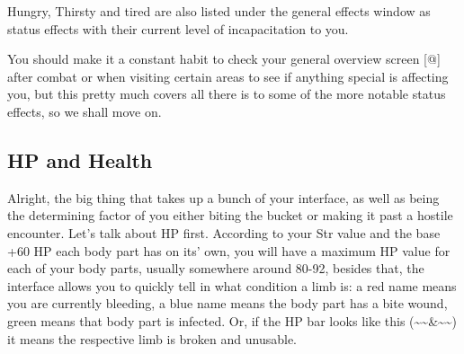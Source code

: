 \documentclass[11pt]{report}
\begin{document}
Hungry, Thirsty and tired are also listed under the general effects window as status effects with their current level of incapacitation to you.

You should make it a constant habit to check your general overview screen [@] after combat or when visiting certain areas to see if anything special is affecting you, but this pretty much covers all there is to some of the more notable status effects, so we shall move on.

\subsection{HP and Health}

Alright, the big thing that takes up a bunch of your interface, as well as being the determining factor of you either biting the bucket or making it past a hostile encounter. Let's talk about HP first. According to your Str value and the base +60 HP each body part has on its' own, you will have a maximum HP value for each of your body parts, usually somewhere around 80-92, besides that, the interface allows you to quickly tell in what condition a limb is: a red name means you are currently bleeding, a blue name means the body part has a bite wound, green means that body part is infected. Or, if the HP bar looks like this (\~{}\~{}\&\~{}\~{}) it means the respective limb is broken and unusable.
\end{document}
